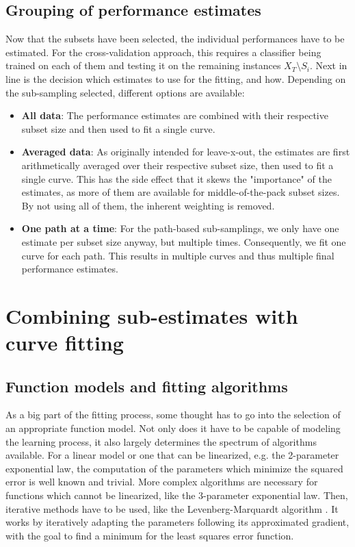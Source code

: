 \subsection{Grouping of performance estimates}
Now that the subsets have been selected, the individual performances have to be estimated. For the cross-validation approach, this requires a classifier being trained on each of them and testing it on the remaining instances $X_T \setminus S_i$. Next in line is the decision which estimates to use for the fitting, and how. Depending on the sub-sampling selected, different options are available:

\begin{itemize}
	\item \textbf{All data}: The performance estimates are combined with their respective subset size and then used to fit a single curve.
	\item \textbf{Averaged data}: As originally intended for leave-x-out, the estimates are first arithmetically averaged over their respective subset size, then used to fit a single curve. This has the side effect that it skews the "importance" of the estimates, as more of them are available for middle-of-the-pack subset sizes. By not using all of them, the inherent weighting is removed.
	\item \textbf{One path at a time}: For the path-based sub-samplings, we only have one estimate per subset size anyway, but multiple times. Consequently, we fit one curve for each path. This results in multiple curves and thus multiple final performance estimates.
\end{itemize}

\section{Combining sub-estimates with curve fitting}

\subsection{Function models and fitting algorithms}
As a big part of the fitting process, some thought has to go into the selection of an appropriate function model. Not only does it have to be capable of modeling the learning process, it also largely determines the spectrum of algorithms available. For a linear model or one that can be linearized, e.g. the 2-parameter exponential law, the computation of the parameters which minimize the squared error is well known and trivial. More complex algorithms are necessary for functions which cannot be linearized, like the 3-parameter exponential law. Then, iterative methods have to be used, like the Levenberg-Marquardt algorithm \cite{Levenberg1944}. It works by iteratively adapting the parameters following its approximated gradient, with the goal to find a minimum for the least squares error function.

